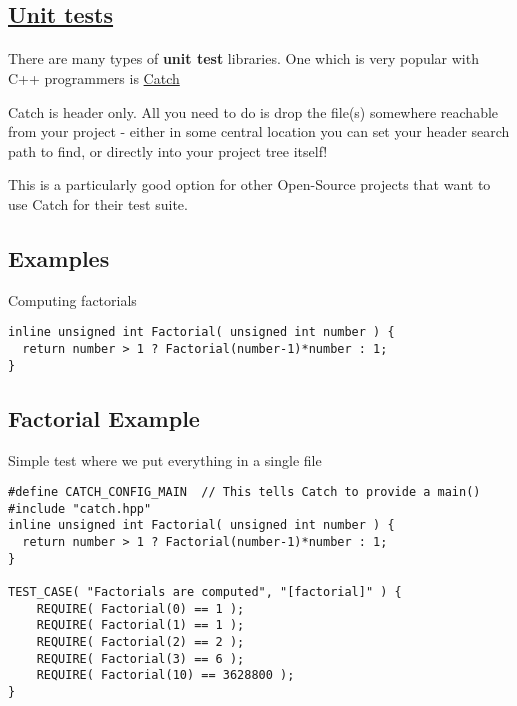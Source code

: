 \subsection*{\href{{https://github.com/philsquared/Catch/blob/master/docs/tutorial.md}}{Unit tests}}

\paragraph{}
There are many types of \textbf{unit test} libraries. One which is very popular with C++ programmers is \href{{https://github.com/philsquared/Catch/blob/master/docs/tutorial.md}}{Catch}

Catch is header only. All you need to do is drop the file(s) somewhere reachable from your project - either in some central location you can set your header search path to find, or directly into your project tree itself! 

This is a particularly good option for other Open-Source projects that want to use Catch for their test suite.



\subsection*{Examples}

Computing factorials




\begin{verbatim}
inline unsigned int Factorial( unsigned int number ) {
  return number > 1 ? Factorial(number-1)*number : 1;
}

\end{verbatim}


\subsection*{Factorial Example}

Simple test where we put everything in a single file 
















\begin{verbatim}
#define CATCH_CONFIG_MAIN  // This tells Catch to provide a main()
#include "catch.hpp"
inline unsigned int Factorial( unsigned int number ) {
  return number > 1 ? Factorial(number-1)*number : 1;
}

TEST_CASE( "Factorials are computed", "[factorial]" ) {
    REQUIRE( Factorial(0) == 1 );
    REQUIRE( Factorial(1) == 1 );
    REQUIRE( Factorial(2) == 2 );
    REQUIRE( Factorial(3) == 6 );
    REQUIRE( Factorial(10) == 3628800 );
}


\end{verbatim}


